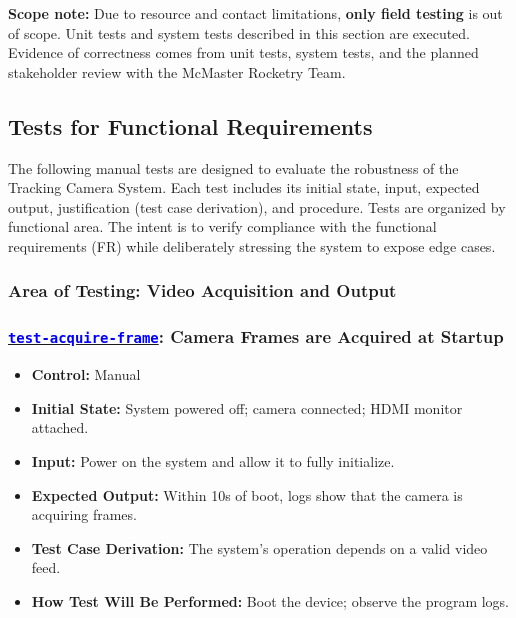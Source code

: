 \documentclass[12pt, titlepage]{article}
\newcommand{\tid}[1]{\hyperlink{tid:#1}{\textcolor{blue}{\texttt{#1}}}}
\begin{document}
\textbf{Scope note:} Due to resource and contact limitations, \textbf{only field
  testing} is out of scope. Unit tests and system tests
described in this section are executed. Evidence of correctness comes from unit
tests, system tests, and the planned stakeholder review
with the McMaster Rocketry Team.

\subsection{Tests for Functional Requirements}

The following manual tests are designed to evaluate the robustness of the
Tracking Camera System. Each test includes its initial state, input, expected
output, justification (test case derivation), and procedure. Tests are
organized by functional area. The intent is to verify compliance with the
functional requirements (FR) while deliberately stressing the system to expose
edge cases.

\subsubsection{Area of Testing: Video Acquisition and Output}

\subsubsection*{\tid{test-acquire-frame}: Camera Frames are Acquired at Startup}
\begin{itemize}
  \item \textbf{Control:} Manual
  \item \textbf{Initial State:} System powered off; camera connected; HDMI monitor attached.
  \item \textbf{Input:} Power on the system and allow it to fully initialize.
  \item \textbf{Expected Output:} Within 10s of boot, logs show that the camera is acquiring frames.
  \item \textbf{Test Case Derivation:} The system's operation depends on a valid video feed.
  \item \textbf{How Test Will Be Performed:} Boot the device; observe the program logs.
\end{itemize}
\end{document}
